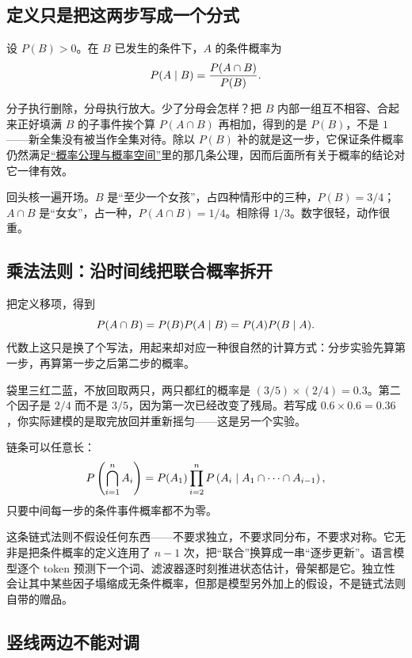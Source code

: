 \subsection{定义只是把这两步写成一个分式}

\begin{definition}
设 \(P(B)>0\)。在 \(B\) 已发生的条件下，\(A\) 的条件概率为
\[
P(A\mid B)=\frac{P(A\cap B)}{P(B)}.
\]
\end{definition}

分子执行删除，分母执行放大。少了分母会怎样？把 \(B\) 内部一组互不相容、合起来正好填满 \(B\) 的子事件挨个算 \(P(A\cap B)\) 再相加，得到的是 \(P(B)\)，不是 \(1\)——新全集没有被当作全集对待。除以 \(P(B)\) 补的就是这一步，它保证条件概率仍然满足\hyperref[sec:05-Probability/01-Probability-Spaces/02]{``概率公理与概率空间''}里的那几条公理，因而后面所有关于概率的结论对它一律有效。

回头核一遍开场。\(B\) 是``至少一个女孩''，占四种情形中的三种，\(P(B)=3/4\)；\(A\cap B\) 是``女女''，占一种，\(P(A\cap B)=1/4\)。相除得 \(1/3\)。数字很轻，动作很重。

\subsection{乘法法则：沿时间线把联合概率拆开}

把定义移项，得到
\[
P(A\cap B)=P(B)P(A\mid B)=P(A)P(B\mid A).
\]
代数上这只是换了个写法，用起来却对应一种很自然的计算方式：分步实验先算第一步，再算第一步之后第二步的概率。

袋里三红二蓝，不放回取两只，两只都红的概率是 \((3/5)\times(2/4)=0.3\)。第二个因子是 \(2/4\) 而不是 \(3/5\)，因为第一次已经改变了残局。若写成 \(0.6\times0.6=0.36\)，你实际建模的是取完放回并重新摇匀——这是另一个实验。

链条可以任意长：
\[
P\left(\bigcap_{i=1}^{n}A_i\right)=P(A_1)\prod_{i=2}^{n}P\left(A_i\mid A_1\cap\cdots\cap A_{i-1}\right),
\]
只要中间每一步的条件事件概率都不为零。

这条链式法则不假设任何东西——不要求独立，不要求同分布，不要求对称。它无非是把条件概率的定义连用了 \(n-1\) 次，把``联合''换算成一串``逐步更新''。语言模型逐个 token 预测下一个词、滤波器逐时刻推进状态估计，骨架都是它。独立性会让其中某些因子塌缩成无条件概率，但那是模型另外加上的假设，不是链式法则自带的赠品。

\subsection{竖线两边不能对调}

